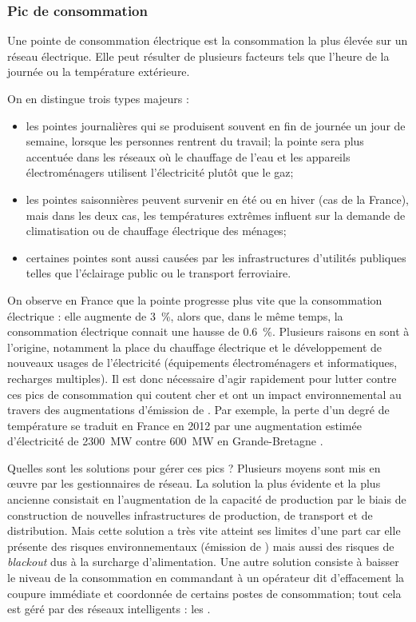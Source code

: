 	\subsubsection{Pic de consommation}
	Une pointe de consommation électrique est la consommation la plus élevée sur un réseau électrique. Elle peut résulter de plusieurs facteurs tels que l'heure de la journée ou la température extérieure.
	
	On en distingue trois types majeurs :
	\begin{itemize}
		\item les pointes journalières qui se produisent souvent en fin de journée un jour de semaine, lorsque les personnes rentrent du travail; la pointe sera plus accentuée dans les réseaux où le chauffage de l'eau et les appareils électroménagers utilisent l'électricité plutôt que le gaz;
		\item les pointes saisonnières peuvent survenir en été ou en hiver (cas de la France), mais dans les deux cas, les températures extrêmes influent sur la demande de climatisation ou de chauffage électrique des ménages;
		\item certaines pointes sont aussi causées par les infrastructures d'utilités publiques telles que l'éclairage public ou le transport ferroviaire.
	\end{itemize}

\bigskip

On observe en France que la pointe progresse plus vite que la consommation électrique : elle augmente de \SI{3}{\percent}, alors que, dans le même temps, la consommation électrique connait une hausse de \SI{0.6}{\percent}. Plusieurs raisons en sont à l'origine, notamment la place du chauffage électrique et le développement de nouveaux usages de l'électricité (équipements électroménagers et informatiques, recharges multiples). Il est donc nécessaire d'agir rapidement pour lutter contre ces pics de consommation qui coutent cher et ont un impact environnemental au travers des augmentations d'émission de .
Par exemple, la perte d'un degré de température se traduit en France en 2012 par une augmentation estimée d'électricité de \SI{2300}{\mega\watt} contre \SI{600}{\mega\watt} en Grande-Bretagne \cite{picFrance}.

Quelles sont les solutions pour gérer ces pics ? Plusieurs moyens sont mis en \oe{}uvre par les gestionnaires de réseau.
La solution la plus évidente et la plus ancienne consistait en l'augmentation de la capacité de production par le biais de construction de nouvelles infrastructures de production, de transport et de distribution. Mais cette solution a très vite atteint ses limites d'une part car elle présente des risques environnementaux (émission de ) mais aussi des risques de \emph{blackout} dus à la surcharge d'alimentation.
Une autre solution consiste à baisser le niveau de la consommation en commandant à un opérateur dit \og{}d'effacement\fg{} la coupure immédiate et coordonnée de certains postes de consommation; tout cela est géré par des réseaux intelligents : les \smartgrids{}.


